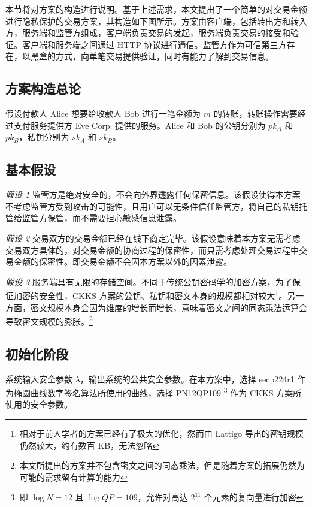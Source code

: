 本节将对方案的构造进行说明。基于上述需求，本文提出了一个简单的对交易金额进行隐私保护的交易方案，其构造如下图所示。方案由客户端，包括转出方和转入方，服务端和监管方组成，客户端负责交易的发起，服务端负责交易的接受和验证。客户端和服务端之间通过 HTTP 协议进行通信。监管方作为可信第三方存在，以黑盒的方式，向单笔交易提供验证，同时有能力了解到交易信息。

\subsection{方案构造总论}


假设付款人 Alice 想要给收款人 Bob 进行一笔金额为 $m$ 的转账，转账操作需要经过支付服务提供方 Eve Corp. 提供的服务。Alice 和 Bob 的公钥分别为 $pk_A$ 和 $pk_B$，私钥分别为 $sk_A$ 和 $sk_B$。

\subsection{基本假设}

\textit{假设 1} 监管方是绝对安全的，不会向外界透露任何保密信息。该假设使得本方案不考虑监管方受到攻击的可能性，且用户可以无条件信任监管方，将自己的私钥托管给监管方保管，而不需要担心敏感信息泄露。

\textit{假设 2} 交易双方的交易金额已经在线下商定完毕。该假设意味着本方案无需考虑交易双方具体的，对交易金额的协商过程的保密性，而只需考虑处理交易过程中交易金额的保密性。即交易金额不会因本方案以外的因素泄露。

\textit{假设 3} 服务端具有无限的存储空间。不同于传统公钥密码学的加密方案，为了保证加密的安全性，CKKS 方案的公钥、私钥和密文本身的规模都相对较大\footnote{相对于前人学者的方案已经有了极大的优化，然而由 Lattigo 导出的密钥规模仍然较大，约有数百 KB，无法忽略}。另一方面，密文规模本身会因为维度的增长而增长，意味着密文之间的同态乘法运算会导致密文规模的膨胀。\footnote{本文所提出的方案并不包含密文之间的同态乘法，但是随着方案的拓展仍然为可能的需求留有计算的能力}

\subsection{初始化阶段}

系统输入安全参数 $\lambda$，输出系统的公共安全参数。在本方案中，选择 secp224r1 作为椭圆曲线数字签名算法所使用的曲线，选择 PN12QP109 \footnote{即 $\log N = 12$ 且 $\log QP = 109$，允许对高达 $2^{11}$ 个元素的复向量进行加密} 作为 CKKS 方案所使用的安全参数。

